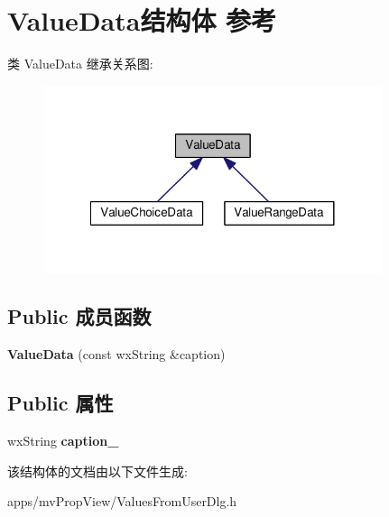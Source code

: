\hypertarget{struct_value_data}{\section{Value\+Data结构体 参考}
\label{struct_value_data}
}


类 Value\+Data 继承关系图\+:
\nopagebreak
\begin{figure}[H]
\begin{center}
\leavevmode
\includegraphics[width=281pt]{struct_value_data__inherit__graph}
\end{center}
\end{figure}
\subsection*{Public 成员函数}
\begin{DoxyCompactItemize}
\item 
\hypertarget{struct_value_data_a0289d669921809b2d4553061a6dda7bc}{{\bfseries Value\+Data} (const wx\+String \&caption)}\label{struct_value_data_a0289d669921809b2d4553061a6dda7bc}

\end{DoxyCompactItemize}
\subsection*{Public 属性}
\begin{DoxyCompactItemize}
\item 
\hypertarget{struct_value_data_ada20cde568059e1dac154d167d4747c7}{wx\+String {\bfseries caption\+\_\+}}\label{struct_value_data_ada20cde568059e1dac154d167d4747c7}

\end{DoxyCompactItemize}


该结构体的文档由以下文件生成\+:\begin{DoxyCompactItemize}
\item 
apps/mv\+Prop\+View/Values\+From\+User\+Dlg.\+h\end{DoxyCompactItemize}
